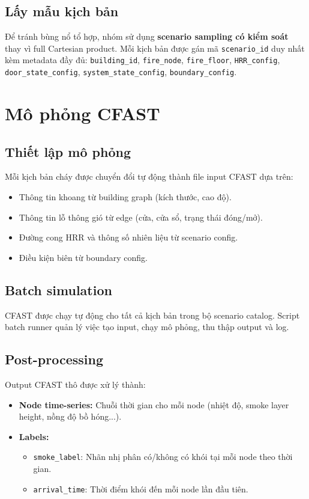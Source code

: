 \subsection{Lấy mẫu kịch bản}

Để tránh bùng nổ tổ hợp, nhóm sử dụng \textbf{scenario sampling có kiểm soát} thay vì full Cartesian product. Mỗi kịch bản được gán mã \texttt{scenario\_id} duy nhất kèm metadata đầy đủ: \texttt{building\_id}, \texttt{fire\_node}, \texttt{fire\_floor}, \texttt{HRR\_config}, \texttt{door\_state\_config}, \texttt{system\_state\_config}, \texttt{boundary\_config}.

\section{Mô phỏng CFAST}
\label{sec:cfastmethod}

\subsection{Thiết lập mô phỏng}

Mỗi kịch bản cháy được chuyển đổi tự động thành file input CFAST dựa trên:
\begin{itemize}
  \item Thông tin khoang từ building graph (kích thước, cao độ).
  \item Thông tin lỗ thông gió từ edge (cửa, cửa sổ, trạng thái đóng/mở).
  \item Đường cong HRR và thông số nhiên liệu từ scenario config.
  \item Điều kiện biên từ boundary config.
\end{itemize}

\subsection{Batch simulation}

CFAST được chạy tự động cho tất cả kịch bản trong bộ scenario catalog. Script batch runner quản lý việc tạo input, chạy mô phỏng, thu thập output và log.

\subsection{Post-processing}

Output CFAST thô được xử lý thành:
\begin{itemize}
  \item \textbf{Node time-series:} Chuỗi thời gian cho mỗi node (nhiệt độ, smoke layer height, nồng độ bồ hóng...).
  \item \textbf{Labels:}
  \begin{itemize}
    \item \texttt{smoke\_label}: Nhãn nhị phân có/không có khói tại mỗi node theo thời gian.
    \item \texttt{arrival\_time}: Thời điểm khói đến mỗi node lần đầu tiên.
  \end{itemize}
\end{itemize}


